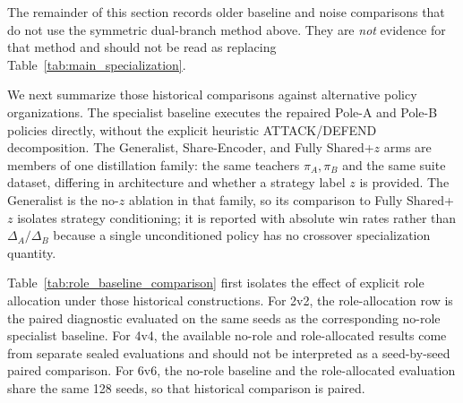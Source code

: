 The remainder of this section records older baseline and noise comparisons
that do not use the symmetric dual-branch method above. They are
\emph{not} evidence for that method and should not be read as replacing
Table~\ref{tab:main_specialization}.

We next summarize those historical comparisons against alternative policy
organizations. The specialist baseline executes the repaired Pole-A and
Pole-B policies directly, without the explicit heuristic ATTACK/DEFEND
decomposition. The Generalist, Share-Encoder, and Fully Shared+$z$ arms are
members of one distillation family: the same teachers $\pi_A,\pi_B$ and the
same suite dataset, differing in architecture and whether a strategy label
$z$ is provided. The Generalist is the no-$z$ ablation in that family, so
its comparison to Fully Shared+$z$ isolates strategy conditioning; it is
reported with absolute win rates rather than $\Delta_A/\Delta_B$ because a
single unconditioned policy has no crossover specialization quantity.

Table~\ref{tab:role_baseline_comparison} first isolates the effect of explicit
role allocation under those historical constructions. For 2v2, the
role-allocation row is the paired diagnostic evaluated on the same seeds as
the corresponding no-role specialist baseline. For 4v4, the available
no-role and role-allocated results come from separate sealed evaluations
and should not be interpreted as a seed-by-seed paired comparison. For 6v6,
the no-role baseline and the role-allocated evaluation share the same 128
seeds, so that historical comparison is paired.

